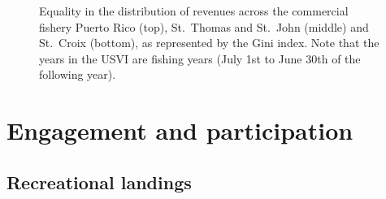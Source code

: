 \documentclass[
  letterpaper,
  oneside,
  open=any]{scrbook}
\begin{document}
\begin{figure}


\caption{\label{fig-gini}Equality in the distribution of revenues across
the commercial fishery Puerto Rico (top), St.~Thomas and St.~John
(middle) and St.~Croix (bottom), as represented by the Gini index. Note
that the years in the USVI are fishing years (July 1st to June 30th of
the following year).}

\end{figure}%

\section{Engagement and
participation}\label{engagement-and-participation}

\subsection{Recreational landings}\label{recreational-landings}
\end{document}
